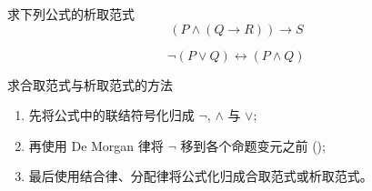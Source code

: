 \begin{frame}{}
  \begin{exampleblock}{求下列公式的析取范式}
    \[
      (P \land (Q \to R)) \to S
    \]

    \[
      \lnot (P \lor Q) \leftrightarrow (P \land Q)
    \]
  \end{exampleblock}
\end{frame}

\begin{frame}{}
  \begin{exampleblock}{求合取范式与析取范式的方法}
    \begin{enumerate}[(1)]
      \setlength{\itemsep}{8pt}
      \item 先将公式中的联结符号化归成 $\lnot$, $\land$ 与 $\lor$;
      \item 再使用 De Morgan 律将 $\lnot$ 移到各个命题变元之前 ();
      \item 最后使用结合律、分配律将公式化归成合取范式或析取范式。
    \end{enumerate}
  \end{exampleblock}
\end{frame}
